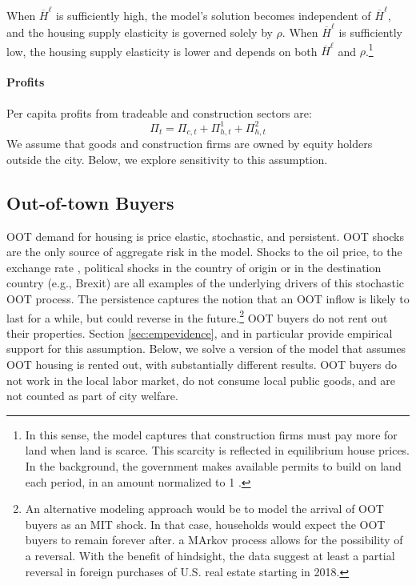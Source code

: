 \documentclass[letterpaper,12pt,dvipsnames,usenames]{article}
\theoremstyle{definition}
\begin{document}
\begin{spacing}{1.25}
 When $\overline{H}^{\ell}$ is sufficiently high, the model's solution becomes independent of $\overline{H}^{\ell}$, and the housing supply elasticity is governed solely by $\rho$. When $\overline{H}^{\ell}$ is sufficiently low, the housing supply elasticity is lower and depends on both $\overline{H}^{\ell}$ and $\rho$.\footnote{In this sense, the model captures that construction firms must pay more for land when land is scarce. This scarcity is reflected in equilibrium house prices. In the background, the government makes available permits to build on land each period, in an amount normalized to 1 \citep{favilukis/ludvigson/nieuwerburgh:09}. }


\paragraph{Profits}
Per capita profits from tradeable and construction sectors are: \[\Pi_t = \Pi_{c,t} + \Pi^{1}_{h,t} + \Pi^{2}_{h,t}\]
We assume that goods and construction firms are owned by  equity holders outside the city.   Below, we explore sensitivity to this assumption.


\subsection{Out-of-town Buyers}

OOT demand for housing is price elastic, stochastic, and persistent. OOT shocks are the only source of aggregate risk in the model. Shocks to the oil price,  to the exchange rate \citep{ruflevi}, political shocks in the country of origin \citep{BR:16} or in the destination country (e.g., Brexit) are all examples  of the underlying drivers of this stochastic OOT process. The persistence captures the notion that an OOT inflow is likely to last for a while, but could reverse in the future.\footnote{An alternative modeling approach would be to model the arrival of OOT buyers as an MIT shock. In that case, households would expect the OOT buyers to remain forever after. a MArkov process allows for the possibility of a reversal. With the benefit of hindsight, the data suggest at least a partial reversal in foreign purchases of U.S. real estate starting in 2018.} OOT buyers do not rent out their properties. Section \ref{sec:empevidence}, and in particular \citet{CS:16} provide empirical support for this assumption. Below, we  solve a version of the model that assumes OOT housing is rented out, with substantially different results. OOT buyers do not work in the local labor market, do not consume local public goods, and are not counted as part of city welfare.


\end{spacing}
\end{document}
